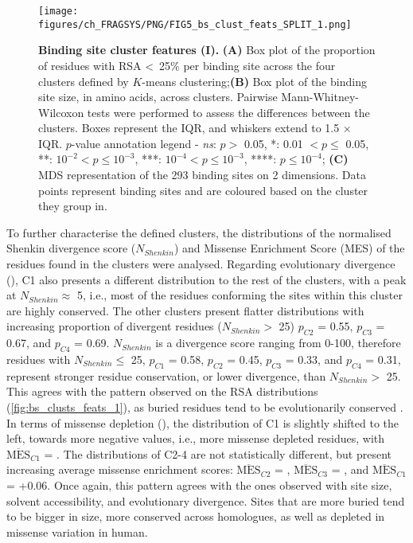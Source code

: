 \begin{figure}[htb!]
    \centering
    \texttt{[image: figures/ch\_FRAGSYS/PNG/FIG5\_bs\_clust\_feats\_SPLIT\_1.png]}
    \caption[Binding site cluster features (I)]{\textbf{Binding site cluster features (I).} \textbf{(A)} Box plot of the proportion of residues with RSA \textless~25\% per binding site across the four clusters defined by $K$-means clustering;\textbf{(B)} Box plot of the binding site size, in amino acids, across clusters. Pairwise Mann-Whitney-Wilcoxon tests were performed to assess the differences between the clusters. Boxes represent the IQR, and whiskers extend to 1.5 $\times$ IQR. $p$-value annotation legend - \textit{ns}: $p >$ 0.05, *: 0.01 $< p \leq$ 0.05, **: $10^{-2} < p \leq 10^{-3}$, ***: $10^{-4} < p \leq 10^{-3}$, ****: $p \leq 10^{-4}$; \textbf{(C)} MDS representation of the 293 binding sites on 2 dimensions. Data points represent binding sites and are coloured based on the cluster they group in.}
    \label{fig:bs_clusts_feats_1}
\end{figure}

To further characterise the defined clusters, the distributions of the normalised Shenkin divergence score ($N_{Shenkin}$) and Missense Enrichment Score (MES) of the residues found in the clusters were analysed. Regarding evolutionary divergence (), C1 also presents a different distribution to the rest of the clusters, with a peak at $N_{Shenkin} \approx$ 5, i.e., most of the residues conforming the sites within this cluster are highly conserved. The other clusters present flatter distributions with increasing proportion of divergent residues ($N_{Shenkin} >$ 25) $p_{C2}$ = 0.55, $p_{C3}$ = 0.67, and $p_{C4}$ = 0.69. $N_{Shenkin}$ is a divergence score ranging from 0-100, therefore residues with $N_{Shenkin} \leq$ 25, $p_{C1}$ = 0.58, $p_{C2}$ = 0.45, $p_{C3}$ = 0.33, and $p_{C4}$ = 0.31, represent stronger residue conservation, or lower divergence, than $N_{Shenkin} >$ 25. This agrees with the pattern observed on the RSA distributions (\autoref{fig:bs_clusts_feats_1}), as buried residues tend to be evolutionarily conserved \cite{CHOTHIA_1986_CONSERVATION, RUSSELL_1994_UNCONSERVATION}. In terms of missense depletion (), the distribution of C1 is slightly shifted to the left, towards more negative values, i.e., more missense depleted residues, with $\overline{\text{MES}}_{C1}$ = . The distributions of C2-4 are not statistically different, but present increasing average missense enrichment scores: $\overline{\text{MES}}_{C2}$ = , $\overline{\text{MES}}_{C3}$ = , and $\overline{\text{MES}}_{C1}$ = +0.06. Once again, this pattern agrees with the ones observed with site size, solvent accessibility, and evolutionary divergence. Sites that are more buried tend to be bigger in size, more conserved across homologues, as well as depleted in missense variation in human.

